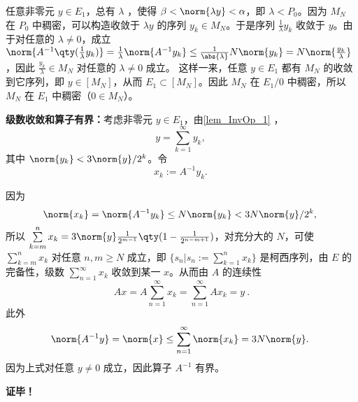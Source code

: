 任意非零元 $y\in E_1$，总有 $\lambda$ ，使得 $\beta<\norm{\lambda y}<\alpha$，即 $\lambda<P_0$。因为 $M_N$ 在 $P_0$ 中稠密，可以构造收敛于 $\lambda y$ 的序列 $y_k\in M_N$。于是序列 $\frac{1}{\lambda}y_k$ 收敛于 $y$。由于对任意的 $\lambda\neq0$，成立 $\norm{A^{-1}\qty(\frac{1}{\lambda}y_k)}=\frac{1}{\lambda}\norm{A^{-1}y_k}\leq\frac{1}{\abs{\lambda}}N\norm{y_k}=N\norm{\frac{y_k}{\lambda}}$，因此 $\frac{y_k}{\lambda}\in M_N$ 对任意的 $\lambda\neq0$ 成立。
这样一来，任意 $y\in E_1$ 都有 $M_N$ 的收敛到它序列，即 $y\in[M_N]$，从而 $E_1\subset [M_N]$。因此 $M_N$ 在 $E_1/0$ 中稠密，所以 $M_N$ 在 $E_1$ 中稠密（$0\in M_N$）。

\textbf{级数收敛和算子有界：}考虑非零元 $y\in E_1$，由\autoref{lem_InvOp_1} ，
\begin{equation}
y=\sum_{k=1}^\infty y_k,~
\end{equation}
其中 $\norm{y_k}<3\norm{y}/2^k$。令
\begin{equation}
x_k:=A^{-1}y_k.~
\end{equation}

因为
\begin{equation}
\norm{x_k}=\norm{A^{-1}y_k}\leq N\norm{y_k}<3N\norm{y}/2^k,~
\end{equation}
所以  $\sum\limits_{k=m}^n x_k=3\norm{y}\frac{1}{2^{m-1}}\qty(1-\frac{1}{2^{n-m+1}})$，对充分大的 $N$，可使 $\sum\limits_{k=m}^n x_k$ 对任意 $n,m\geq N$ 成立，即 $\{s_n|s_n:=\sum\limits_{k=1}^n x_k\}$ 是柯西序列，由 $E$ 的完备性，级数 $\sum\limits_{n=1}^\infty x_k$ 收敛到某一 $x$。从而由 $A$ 的连续性
\begin{equation}
Ax=A\sum\limits_{n=1}^\infty x_k=\sum\limits_{n=1}^\infty Ax_k=y~.
\end{equation}
此外
\begin{equation}
\norm{A^{-1}y}=\norm{x}\leq\sum_{n=1}^\infty\norm{x_k}=3N\norm{y}.~
\end{equation}
因为上式对任意 $y\neq0$ 成立，因此算子 $A^{-1}$ 有界。



\textbf{证毕！}



